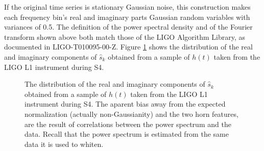 \documentclass{article}
\begin{document}
If the original time series is stationary Gaussian noise, this construction
makes each frequency bin's real and imaginary parts Gaussian random
variables with variances of 0.5.  The definition of the power spectral
density and of the Fourier transform shown above both match those of the
LIGO Algorithm Library, as documented in LIGO-T010095-00-Z.  Figure
\ref{fig:shistogram} shows the distribution of the real and imaginary
components of \(\hat{s}_{k}\) obtained from a sample of \(h(t)\) taken from
the LIGO L1 instrument during S4.
\begin{figure}
\begin{center}
\end{center}
\caption{The distribution of the real and imaginary components of
\(\hat{s}_{k}\) obtained from a sample of \(h(t)\) taken from the LIGO L1
instrument during S4.  The aparent bias away from the expected
normalization (actually non-Gaussianity) and the two horn features, are the
result of correlations between the power spectrum and the data.  Recall
that the power spectrum is estimated from the same data it is used to
whiten.}
\label{fig:shistogram}
\end{figure}
\end{document}

